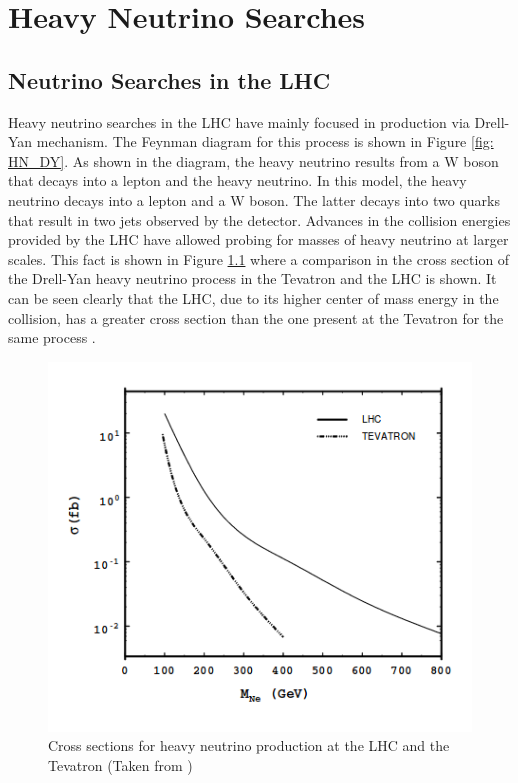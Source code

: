 \graphicspath{{NeutrinoSearches/Figures/}}

\chapter{Heavy Neutrino Searches}\label{chapter: neutrinoSearches}

\section{Neutrino Searches in the LHC}

Heavy neutrino searches in the LHC have mainly focused in production via Drell-Yan mechanism. The Feynman diagram for this process is shown in Figure \ref{fig: HN_DY}. As shown in the diagram, the heavy neutrino results from  a W boson that decays into a lepton and the heavy neutrino. In this model, the heavy neutrino decays into a lepton and a W boson. The latter decays into two quarks that result in two jets observed by the detector. Advances in the collision energies provided by the LHC have allowed probing for masses of heavy neutrino at larger scales. This fact is shown in Figure \ref{fig: LHCvsTevatron} where a comparison in the cross section of the Drell-Yan heavy neutrino process in the Tevatron and the LHC is shown. It can be seen clearly that the LHC, due to its higher center of mass energy in the collision, has a greater cross section than the one present at the Tevatron for the same process \cite{Tevatron}.


\begin{figure}[H]
\centering
\includegraphics[width=\linewidth]{LHCvsTevatron}
\caption{Cross sections for heavy neutrino production at the LHC and the Tevatron (Taken from \cite{Tevatron})}
\label{fig: LHCvsTevatron}
\end{figure}


